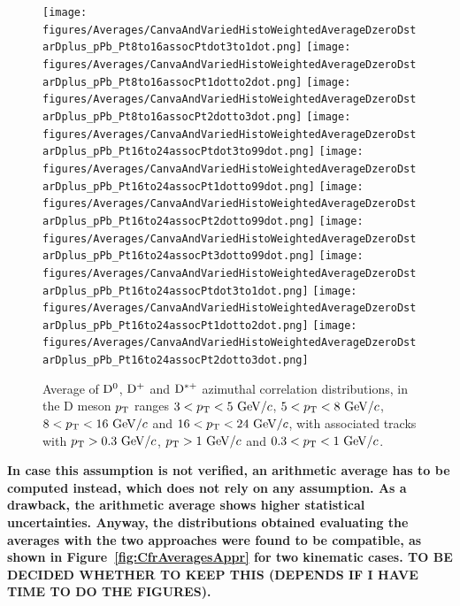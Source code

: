 \begin{figure}
\centering
{\texttt{[image: figures/Averages/CanvaAndVariedHistoWeightedAverageDzeroDstarDplus\_pPb\_Pt8to16assocPtdot3to1dot.png]}}
{\texttt{[image: figures/Averages/CanvaAndVariedHistoWeightedAverageDzeroDstarDplus\_pPb\_Pt8to16assocPt1dotto2dot.png]}}
{\texttt{[image: figures/Averages/CanvaAndVariedHistoWeightedAverageDzeroDstarDplus\_pPb\_Pt8to16assocPt2dotto3dot.png]}}
{\texttt{[image: figures/Averages/CanvaAndVariedHistoWeightedAverageDzeroDstarDplus\_pPb\_Pt16to24assocPtdot3to99dot.png]}}
{\texttt{[image: figures/Averages/CanvaAndVariedHistoWeightedAverageDzeroDstarDplus\_pPb\_Pt16to24assocPt1dotto99dot.png]}}
{\texttt{[image: figures/Averages/CanvaAndVariedHistoWeightedAverageDzeroDstarDplus\_pPb\_Pt16to24assocPt2dotto99dot.png]}}
{\texttt{[image: figures/Averages/CanvaAndVariedHistoWeightedAverageDzeroDstarDplus\_pPb\_Pt16to24assocPt3dotto99dot.png]}}
{\texttt{[image: figures/Averages/CanvaAndVariedHistoWeightedAverageDzeroDstarDplus\_pPb\_Pt16to24assocPtdot3to1dot.png]}}
{\texttt{[image: figures/Averages/CanvaAndVariedHistoWeightedAverageDzeroDstarDplus\_pPb\_Pt16to24assocPt1dotto2dot.png]}}
{\texttt{[image: figures/Averages/CanvaAndVariedHistoWeightedAverageDzeroDstarDplus\_pPb\_Pt16to24assocPt2dotto3dot.png]}}
 \caption{Average of ${\rm D^0}$, ${\rm D^+}$ and ${\rm D^{*+}}$ azimuthal correlation distributions, in the D meson $p_{\rm T}$ ranges $3<p_{\rm T}<5~\mathrm{GeV}/c$, $5<p_{\rm T}<8~\mathrm{GeV}/c$, $8<p_{\rm T}<16~\mathrm{GeV}/c$ and $16<p_{\rm T}<24~\mathrm{GeV}/c$, with associated tracks with $p_{\rm T}>0.3~\mathrm{GeV}/c$, $p_{\rm T}>1~\mathrm{GeV}/c$ and $0.3 < p_{\rm T} < 1~\mathrm{GeV}/c$.}
 \label{fig:DmesonAverage}
\end{figure}

{\bf In case this assumption is not verified, an arithmetic average has to be computed instead, which does not rely on any assumption. As a drawback, the arithmetic average shows higher statistical uncertainties. Anyway, the distributions obtained evaluating the averages with the two approaches were found to be compatible, as shown in Figure~\ref{fig:CfrAveragesAppr} for two kinematic cases. TO BE DECIDED WHETHER TO KEEP THIS (DEPENDS IF I HAVE TIME TO DO THE FIGURES).}


